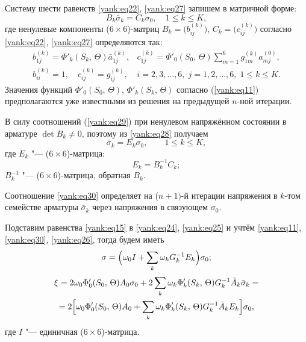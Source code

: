 Систему шести равенств \eqref{yank:eq22}, \eqref{yank:eq27} запишем в матричной форме:
\begin{equation}
\label{yank:eq28}
B_k \bar {\sigma }_k =C_k \sigma _0,\quad 1\le k\le K,
\end{equation}
где ненулевые компоненты ($6{\times}6$)-матриц $B_k =\bigl( b_{ij}^{(k)}\bigr)$, $C_k =\bigl(c_{ij}^{(k)} \bigr)$ согласно \eqref{yank:eq22}, \eqref{yank:eq27} определяются так:
\begin{equation}
\label{yank:eq29}
\begin{array}{ll}
 b_{1j}^{(k)} = \Phi'_k (S_k,\,\Theta)\bar {a}_{1j}^{(k)}, & \displaystyle c_{1j}^{(k)} = \Phi'_0 (S_0,\,\Theta)  \sum\limits_{m=1}^6 g_{1m}^{(k)} a_{mj}^{(0)}, \\
 b_{ii}^{(k)} =1,\quad c_{ij}^{(k)} =g_{ij}^{(k)}, & i=2, 3, \dots, 6, \; j=1, 2, \dots, 6,\; 1\le k\le K.
 \end{array}
\end{equation}
Значения функций $\Phi'_0 (S_0,\,\Theta)$, $\Phi'_k
(S_k,\,\Theta)$ согласно (\ref{yank:eq11}) предполагаются уже
известными из решения на предыдущей $n$-ной итерации.

В силу соотношений (\ref{yank:eq29}) при ненулевом напряжённом состоянии в арматуре $\det B_k \ne 0$, поэтому из \eqref{yank:eq28} получаем
\begin{equation}
\label{yank:eq30}
\bar {\sigma }_k =E_k \sigma _0,\qquad 1\le k\le K,
\end{equation}
где $E_k$ "---  ($6{\times}6$)-матрица:
\begin{equation}
\label{yank:eq31}
 E_k =B_k^{-1} C_k;
\end{equation}
$B_k^{-1}$ "--- ($6{\times}6$)-матрица, обратная $B_k $.

Соотношение \eqref{yank:eq30} определяет на ($n+1)$-й итерации напряжения в $k$-том семействе арматуры $\bar {\sigma }_k $ через напряжения в связующем $\sigma _0 $.

Подставим равенства \eqref{yank:eq15} в \eqref{yank:eq24}, \eqref{yank:eq25} и учтём \eqref{yank:eq11}, \eqref{yank:eq30}, \eqref{yank:eq26}, тогда будем иметь
\begin{equation}
\label{yank:eq32}
\sigma =\Bigl( \omega _0 I +\sum\limits_k \omega _k G_k^{-1} E_k \Bigr)\sigma_0;
\end{equation}
\begin{multline}
\label{yank:eq33}
\xi =2\omega _0 \Phi'_0 (S_0,\,\Theta) A_0 \sigma _0 + 2\sum\limits_k \omega _k \Phi'_k  (S_k,\,\Theta) G_k^{-1} \bar
{A}_k \bar {\sigma }_k = \\
 =2\Bigl[ \omega _0 \Phi'_0 (S_0,\,\Theta)A_0
+\sum\limits_k \omega _k \Phi'_k (S_k ,\,\Theta ) G_k^{-1} \bar {A}_k E_k \Bigr] \sigma _0,
\end{multline}
где $I $ "---  единичная ($6{\times}6$)-матрица.

